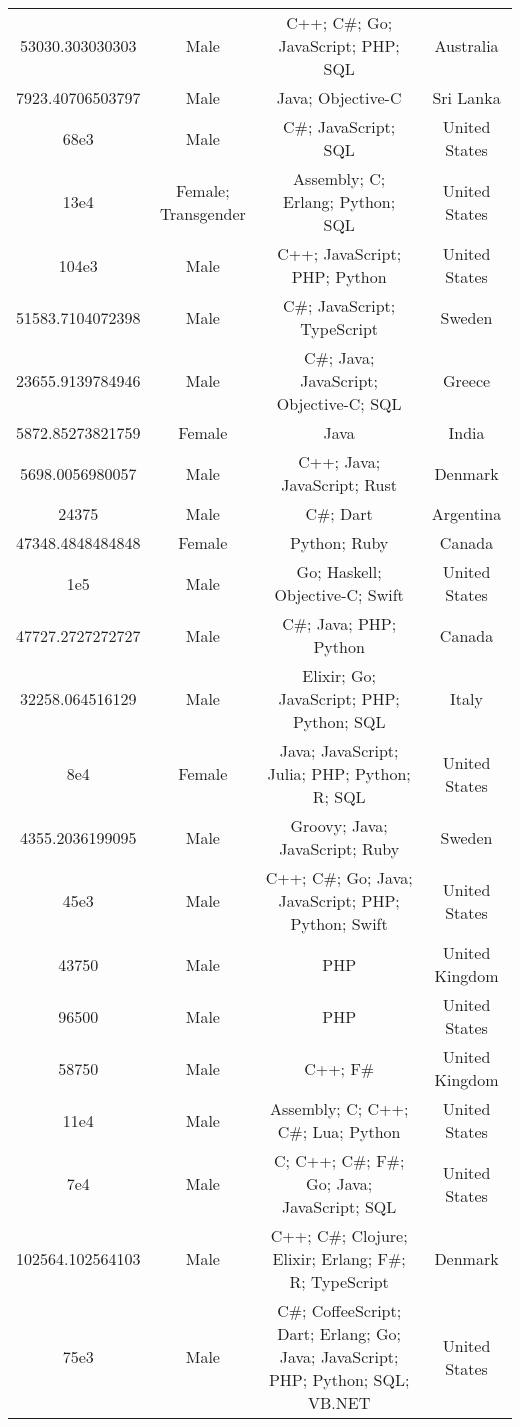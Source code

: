 \begin{center}
\begin{tabular}{ |c|c|c|c| }
53030.303030303  &  Male  &  C++; C\#; Go; JavaScript; PHP; SQL  &  Australia  \\ 
7923.40706503797  &  Male  &  Java; Objective-C  &  Sri Lanka  \\ 
68e3  &  Male  &  C\#; JavaScript; SQL  &  United States  \\ 
13e4  &  Female; Transgender  &  Assembly; C; Erlang; Python; SQL  &  United States  \\ 
104e3  &  Male  &  C++; JavaScript; PHP; Python  &  United States  \\ 
51583.7104072398  &  Male  &  C\#; JavaScript; TypeScript  &  Sweden  \\ 
23655.9139784946  &  Male  &  C\#; Java; JavaScript; Objective-C; SQL  &  Greece  \\ 
5872.85273821759  &  Female  &  Java  &  India  \\ 
5698.0056980057  &  Male  &  C++; Java; JavaScript; Rust  &  Denmark  \\ 
24375  &  Male  &  C\#; Dart  &  Argentina  \\ 
47348.4848484848  &  Female  &  Python; Ruby  &  Canada  \\ 
1e5  &  Male  &  Go; Haskell; Objective-C; Swift  &  United States  \\ 
47727.2727272727  &  Male  &  C\#; Java; PHP; Python  &  Canada  \\ 
32258.064516129  &  Male  &  Elixir; Go; JavaScript; PHP; Python; SQL  &  Italy  \\ 
8e4  &  Female  &  Java; JavaScript; Julia; PHP; Python; R; SQL  &  United States  \\ 
4355.2036199095  &  Male  &  Groovy; Java; JavaScript; Ruby  &  Sweden  \\ 
45e3  &  Male  &  C++; C\#; Go; Java; JavaScript; PHP; Python; Swift  &  United States  \\ 
43750  &  Male  &  PHP  &  United Kingdom  \\ 
96500  &  Male  &  PHP  &  United States  \\ 
58750  &  Male  &  C++; F\#  &  United Kingdom  \\ 
11e4  &  Male  &  Assembly; C; C++; C\#; Lua; Python  &  United States  \\ 
7e4  &  Male  &  C; C++; C\#; F\#; Go; Java; JavaScript; SQL  &  United States  \\ 
102564.102564103  &  Male  &  C++; C\#; Clojure; Elixir; Erlang; F\#; R; TypeScript  &  Denmark  \\ 
75e3  &  Male  &  C\#; CoffeeScript; Dart; Erlang; Go; Java; JavaScript; PHP; Python; SQL; VB.NET  &  United States  \\ 

\end{tabular}
\end{center}
